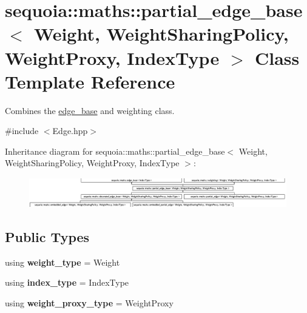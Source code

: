 \hypertarget{classsequoia_1_1maths_1_1partial__edge__base}{}\section{sequoia\+::maths\+::partial\+\_\+edge\+\_\+base$<$ Weight, Weight\+Sharing\+Policy, Weight\+Proxy, Index\+Type $>$ Class Template Reference}
\label{classsequoia_1_1maths_1_1partial__edge__base}


Combines the \mbox{\hyperlink{classsequoia_1_1maths_1_1edge__base}{edge\+\_\+base}} and weighting class.  




{\ttfamily \#include $<$Edge.\+hpp$>$}

Inheritance diagram for sequoia\+::maths\+::partial\+\_\+edge\+\_\+base$<$ Weight, Weight\+Sharing\+Policy, Weight\+Proxy, Index\+Type $>$\+:\begin{figure}[H]
\begin{center}
\leavevmode
\includegraphics[height=1.294050cm]{classsequoia_1_1maths_1_1partial__edge__base}
\end{center}
\end{figure}
\subsection*{Public Types}
\begin{DoxyCompactItemize}
\item 
\mbox{\label{classsequoia_1_1maths_1_1partial__edge__base_afe46bc35c1e1e2629e9be62a1090ac20}} 
using {\bfseries weight\+\_\+type} = Weight
\item 
\mbox{\label{classsequoia_1_1maths_1_1partial__edge__base_ab599e5f3a01d5dabd07eee1a4047e476}} 
using {\bfseries index\+\_\+type} = Index\+Type
\item 
\mbox{\label{classsequoia_1_1maths_1_1partial__edge__base_a1de303eed37964e2c0dd538c3f76495f}} 
using {\bfseries weight\+\_\+proxy\+\_\+type} = Weight\+Proxy
\end{DoxyCompactItemize}
